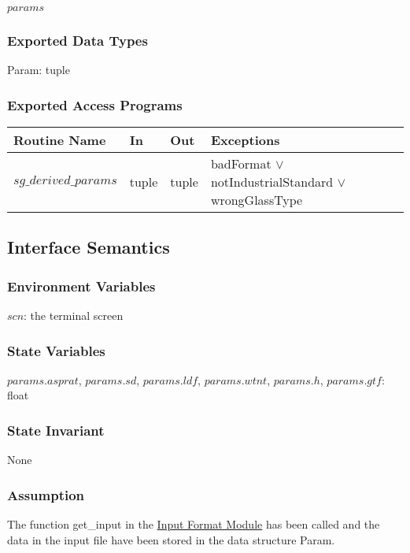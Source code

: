 \documentclass[12pt]{article}
\newcommand{\InputFormat}{\hyperref[SecInF]{Input Format Module}}
\begin{document}
$params$

\subsubsection{Exported Data Types}

Param: tuple

\subsubsection{Exported Access Programs}
\begin{center}
\begin{tabular}{l l l p{}} \hline 
\textbf{Routine Name} & \textbf{In} &\textbf{Out} & \textbf{Exceptions} \\ \hline 
$sg\_derived\_params$ & tuple & tuple & badFormat $\vee$ notIndustrialStandard $\vee$ wrongGlassType\\ \hline
\end{tabular}
\end{center}

\subsection{Interface Semantics}

\subsubsection{Environment Variables}

$scn$: the terminal screen

\subsubsection{State Variables}

$params.asprat$, $params.sd$, $params.ldf$, $params.wtnt$, $params.h$, \newline $params.gtf$: float

\subsubsection{State Invariant}

None

\subsubsection{Assumption}

The function get\_input in the \InputFormat{} has been called and the data in 
the input file have been stored in the data structure Param.
\end{document}
